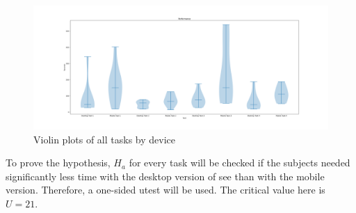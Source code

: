 \begin{figure}
  \centering
  \includegraphics*[width=1.15\textwidth]{Evaluation/img/speed1_violin.png}
  \caption{Violin plots of all tasks by device}
  \label{fig:speed_violin}
\end{figure}

To prove the hypothesis, $H_a$ for every task will be checked if the subjects needed significantly less time with the desktop version of \gls{see} than with the mobile version.
Therefore, a one-sided \gls{utest} will be used.
The critical value here is $U = 21$.

